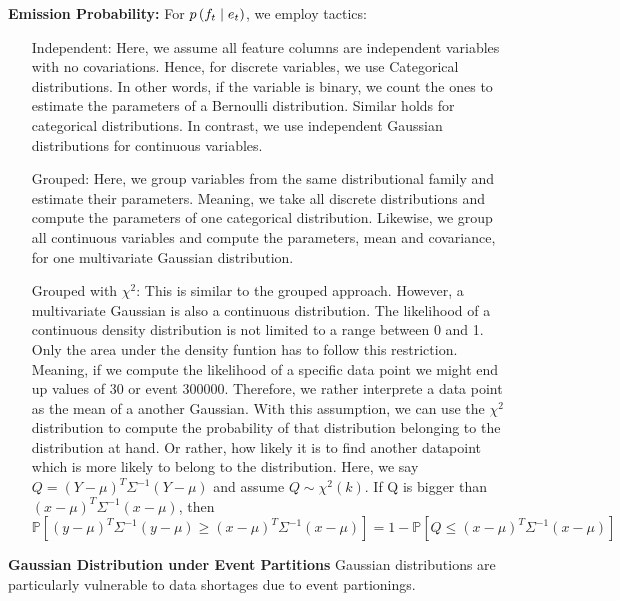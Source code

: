 \documentclass[./../../paper.tex]{subfiles}
\begin{document}
\noindent\textbf{Emission Probability:} For $p\left(f_t \mid e_t\right)$, we employ  tactics:
\begin{enumerate}
    \item[Independent:] Here, we assume all feature columns are independent variables with no covariations. Hence, for discrete variables, we use Categorical distributions. In other words, if the variable is binary, we count the ones to estimate the parameters of a Bernoulli distribution. Similar holds for categorical distributions. In contrast, we use independent Gaussian distributions for continuous variables.
    \item[Grouped:] Here, we group variables from the same distributional family and estimate their parameters. Meaning, we take all discrete distributions and compute the parameters of one categorical distribution. Likewise, we group all continuous variables and compute the parameters, mean and covariance, for one multivariate Gaussian distribution.
    \item[Grouped with $\chi^2$:] This is similar to the grouped approach. However, a multivariate Gaussian is also a continuous distribution. The likelihood of a continuous density distribution is not limited to a range between 0 and 1. Only the area under the density funtion has to follow this restriction. Meaning, if we compute the likelihood of a specific data point we might end up values of 30 or event 300000. Therefore, we rather interprete a data point as the mean of a another Gaussian. With this assumption, we can use the $\chi^2$ distribution to compute the probability of that distribution belonging to the distribution at hand. Or rather, how likely it is to find another datapoint which is more likely to belong to the distribution. Here, we say $Q=(Y-\mu)^{T} \Sigma^{-1}(Y-\mu)$  and assume $Q \sim \chi^{2}(k)$. If Q is bigger than $(x-\mu)^{T} \Sigma^{-1}(x-\mu)$, then $\mathbb{P}\left[(y-\mu)^{T} \Sigma^{-1}(y-\mu) \geq(x-\mu)^{T} \Sigma^{-1}(x-\mu)\right]=1-\mathbb{P}\left[Q \leq(x-\mu)^{T} \Sigma^{-1}(x-\mu)\right]$
\end{enumerate}

\noindent\textbf{Gaussian Distribution under Event Partitions}
Gaussian distributions are particularly vulnerable to data shortages due to event partionings.
\end{document}
